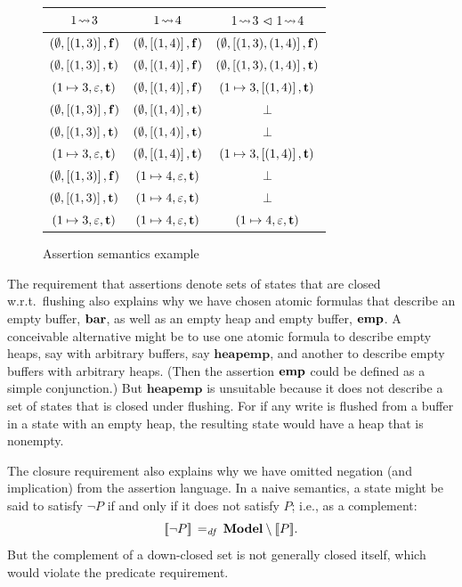 \documentclass[11pt]{report}
\begin{document}
\begin{figure}[ht]
    \centering
    \begin{tabular}{c|c|c}
        $1 \!\leadsto\! 3$ &  $1 \!\leadsto\! 4$ & $1 \!\leadsto\! 3 \operatorname{\,\vartriangleleft\,} 1 \!\leadsto\! 4$\\ \hline
        $(\operatorname{\emptyset},\left[(1,3)\right],\mathbf{f})$ & $(\operatorname{\emptyset},\left[(1,4)\right],\mathbf{f})$ & $(\operatorname{\emptyset},\left[(1,3),(1,4)\right],\mathbf{f})$\\ 
        $(\operatorname{\emptyset},\left[(1,3)\right],\mathbf{t})$ & $(\operatorname{\emptyset},\left[(1,4)\right],\mathbf{f})$ & $(\operatorname{\emptyset},\left[(1,3),(1,4)\right],\mathbf{t})$\\ 
        $(1 \mapsto 3,\varepsilon,\mathbf{t})$ & $(\operatorname{\emptyset},\left[(1,4)\right],\mathbf{f})$ & $(1 \mapsto 3,\left[(1,4)\right],\mathbf{t})$\\ 
        $(\operatorname{\emptyset},\left[(1,3)\right],\mathbf{f})$ & $(\operatorname{\emptyset},\left[(1,4)\right],\mathbf{t})$ & $\bot$\\ 
        $(\operatorname{\emptyset},\left[(1,3)\right],\mathbf{t})$ & $(\operatorname{\emptyset},\left[(1,4)\right],\mathbf{t})$ & $\bot$\\ 
        $(1 \mapsto 3,\varepsilon,\mathbf{t})$ & $(\operatorname{\emptyset},\left[(1,4)\right],\mathbf{t})$ & $(1 \mapsto 3,\left[(1,4)\right],\mathbf{t})$\\ 
        $(\operatorname{\emptyset},\left[(1,3)\right],\mathbf{f})$ & $(1 \mapsto 4,\varepsilon,\mathbf{t})$ & $\bot$ \\
        $(\operatorname{\emptyset},\left[(1,3)\right],\mathbf{t})$ & $(1 \mapsto 4,\varepsilon,\mathbf{t})$ & $\bot$ \\
        $(1 \mapsto 3,\varepsilon,\mathbf{t})$ & $(1 \mapsto 4,\varepsilon,\mathbf{t})$ & $(1 \mapsto 4,\varepsilon,\mathbf{t})$\\ 
    \end{tabular}
    \caption{\label{fig:leads-to-seq-example}Assertion semantics example}
\end{figure}

The requirement that assertions denote sets of states that are closed w.r.t.~flushing also explains why we have chosen atomic formulas that describe an empty buffer, $\mathbf{bar}$, as well as an empty heap and empty buffer, $\mathbf{emp}$. A conceivable alternative might be to use one atomic formula to describe empty heaps, say with arbitrary buffers, say $\mathbf{heapemp}$, and another to describe empty buffers with arbitrary heaps. (Then the assertion $\mathbf{emp}$ could be defined as a simple conjunction.) But $\mathbf{heapemp}$ is unsuitable because it does not describe a set of states that is closed under flushing. For if any write is flushed from a buffer in a state with an empty heap, the resulting state would have a heap that is nonempty. 

The closure requirement also explains why we have omitted negation (and implication) from the assertion language. In a naive semantics, a state might be said to satisfy $\neg P$ if and only if it does not satisfy $P$; i.e., as a complement: \[ [\![\neg P]\!] \operatorname{\;=_{\mathit{df}}\;} \mathbf{Model} \setminus [\![P]\!]. \] But the complement of a down-closed set is not generally closed itself, which would violate the predicate requirement. 
\end{document}
